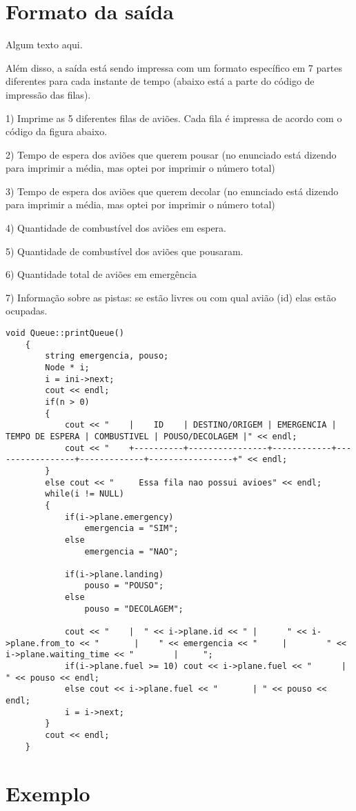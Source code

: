 \documentclass[a4paper,11pt]{article}
\theoremstyle{mytheor}
\begin{document}
\section*{Formato da saída}

Algum texto aqui.\newline

Além disso, a saída está sendo impressa com um formato específico em 7 partes diferentes  para cada instante de tempo (abaixo está a parte do código de impressão das filas).\newline

1) Imprime as 5 diferentes filas de aviões. Cada fila é impressa de acordo com o código da figura abaixo. \newline

2) Tempo de espera dos aviões que querem pousar (no enunciado está dizendo para imprimir a média, mas optei por imprimir o número total)\newline

3) Tempo de espera dos aviões que querem decolar (no enunciado está dizendo para imprimir a média, mas optei por imprimir o número total)\newline

4) Quantidade de combustível dos aviões em espera. \newline

5) Quantidade de combustível dos aviões que pousaram.\newline

6) Quantidade total de aviões em emergência \newline

7) Informação sobre as pistas: se estão livres ou com qual avião (id) elas estão ocupadas.\newline

\begin{lstlisting}[label={list:first},caption= Parte do código em queue.h que imprime informações dos aviões (C++).]
    void Queue::printQueue()
    {
        string emergencia, pouso;
        Node * i;
        i = ini->next;
        cout << endl;
        if(n > 0)
        { 
            cout << "    |    ID    | DESTINO/ORIGEM | EMERGENCIA | TEMPO DE ESPERA | COMBUSTIVEL | POUSO/DECOLAGEM |" << endl;
            cout << "    +----------+----------------+------------+-----------------+-------------+-----------------+" << endl;
        }
        else cout << "     Essa fila nao possui avioes" << endl;
        while(i != NULL)
        {
            if(i->plane.emergency)
                emergencia = "SIM";
            else
                emergencia = "NAO";

            if(i->plane.landing)
                pouso = "POUSO";
            else
                pouso = "DECOLAGEM";
            
            cout << "    |  " << i->plane.id << " |      " << i->plane.from_to << "       |    " << emergencia << "     |        " << i->plane.waiting_time << "        |     ";
            if(i->plane.fuel >= 10) cout << i->plane.fuel << "      | " << pouso << endl;
            else cout << i->plane.fuel << "       | " << pouso << endl;
            i = i->next;
        }
        cout << endl;
    }   
\end{lstlisting}


\section*{Exemplo}
\end{document}
